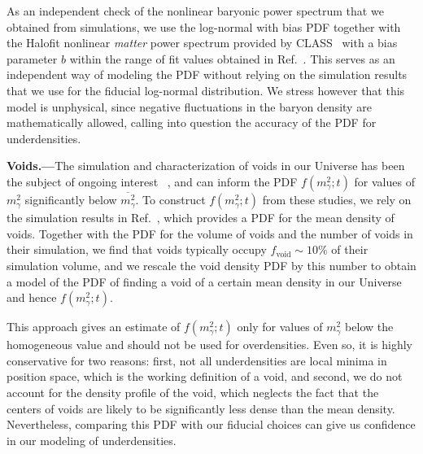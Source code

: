 \documentclass[prd,aps,10pt,nofootinbib,twocolumn,superscriptaddress,preprintnumbers,balancelastpage,longbibliography]{revtex4-1}
\begin{document}
As an independent check of the nonlinear baryonic power spectrum that we obtained from simulations, we use the log-normal with bias PDF together with the Halofit nonlinear \textit{matter} power spectrum provided by CLASS~\cite{Mead:2016zqy} with a bias parameter $b$ within the range of fit values obtained in Ref.~\cite{Hurtado-Gil:2017dbm}. This serves as an independent way of modeling the PDF without relying on the simulation results that we use for the fiducial log-normal distribution. We stress however that this model is unphysical, since negative fluctuations in the baryon density are mathematically allowed, calling into question the accuracy of the PDF for underdensities. 

\noindent
{\bf Voids.---}The simulation and characterization of voids in our Universe has been the subject of ongoing interest ~\cite{Zeldovich:1982zz,Pisani:2019cvo,Einasto:2011eu,Jennings:2013nsa,Chan:2014qka,Plionis:2001gr,Schuster:2019hyl}, and can inform the PDF $f(m_\gamma^2;t)$ for values of $m_\gamma^2$ significantly below $\overline{m_\gamma^2}$. To construct $f(m_\gamma^2;t)$ from these studies, we rely on the simulation results in Ref.~\cite{Adermann:2018jba}, which provides a PDF for the mean density of voids. Together with the PDF for the volume of voids and the number of voids in their simulation, we find that voids typically occupy $f_\text{void} \sim 10\%$ of their simulation volume, and we rescale the void density PDF by this number to obtain a model of the PDF of finding a void of a certain mean density in our Universe and hence $f(m_\gamma^2;t)$. 

This approach gives an estimate of $f(m_\gamma^2;t)$ only for values of $m_\gamma^2$ below the homogeneous value and should not be used for overdensities. Even so, it is highly conservative for two reasons: first, not all underdensities are local minima in position space, which is the working definition of a void, and second, we do not account for the density profile of the void, which neglects the fact that the centers of voids are likely to be significantly less dense than the mean density. Nevertheless, comparing this PDF with our fiducial choices can give us confidence in our modeling of underdensities.
\end{document}
